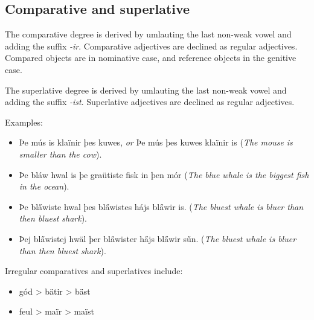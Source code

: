\subsection{Comparative and superlative}

The comparative degree is derived by umlauting the last non-weak vowel and adding the suffix \textit{-ir}. Comparative adjectives are declined as regular adjectives. Compared objects are in nominative case, and reference objects in the genitive case.

The superlative degree is derived by umlauting the last non-weak vowel and adding the suffix \textit{-ist}. Superlative adjectives are declined as regular adjectives.

Examples:

\begin{itemize}
\item Þe mús is klaïnir þes kuwes, \textit{or} Þe mús þes kuwes klaïnir is (\textit{The mouse is smaller than the cow}).
\item Þe bláw hwal is þe graütiste fisk in þen mór (\textit{The blue whale is the biggest fish in the ocean}).
\item Þe bl\H{a}wiste hwal þes bl\H{a}wistes hájs bl\H{a}wir is. (\textit{The bluest whale is bluer than then bluest shark}).
\item Þej bl\H{a}wistej hwäl þer bl\H{a}wister h\H{a}js bl\H{a}wir sűn. (\textit{The bluest whale is bluer than then bluest shark}).
\end{itemize}

Irregular comparatives and superlatives include:

\begin{itemize}
\item gód > bätir > bäst
\item feul > maïr > maïst
\end{itemize}
